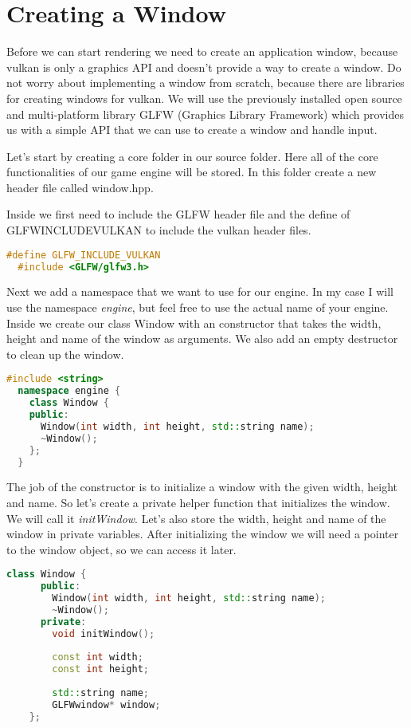 \documentclass[12pt]{report} \usepackage{preamble}
\begin{document}
\section{Creating a Window}

Before we can start rendering we need to create an application window,
because vulkan is only a graphics API and doesn't provide a way to create a window.
Do not worry about implementing a window from scratch,
because there are libraries for creating windows for vulkan. We will use the
previously installed open source and multi-platform library GLFW (Graphics Library Framework)
which provides us with a simple API that we can use to create a window and handle input. \cite{glfw}

Let's start by creating a core folder in our source folder. Here all of the core functionalities
of our game engine will be stored. In this folder create a new header file called window.hpp.

Inside we first need to include the GLFW header file and the define of \\
GLFW\textunderscore INCLUDE\textunderscore VULKAN to include the vulkan header files.

\begin{lstlisting}[language=C++]
  #define GLFW_INCLUDE_VULKAN
  #include <GLFW/glfw3.h>
\end{lstlisting}

Next we add a namespace that we want to use for our engine. In my case I will use
the namespace \textit{engine}, but feel free to use the actual name of your engine.
Inside we create our class Window with an constructor that takes the width, height
and name of the window as arguments. We also add an empty destructor to clean up the window.

\begin{lstlisting}[language=C++]
  #include <string>
  namespace engine {
    class Window {
    public:
      Window(int width, int height, std::string name);
      ~Window();
    };
  }
\end{lstlisting}

The job of the constructor is to initialize a window with the given width, height and name.
So let's create a private helper function that initializes the window. We will call it
\textit{initWindow}. Let's also store the width, height and name of the window in private variables.
After initializing the window we will need a pointer to the window object, so we can access it later.

\begin{lstlisting}[language=C++]
  class Window {
      public:
        Window(int width, int height, std::string name);
        ~Window();
      private:
        void initWindow();
      
        const int width;
        const int height;
      
        std::string name;
        GLFWwindow* window;
    };
\end{lstlisting}
\end{document}
